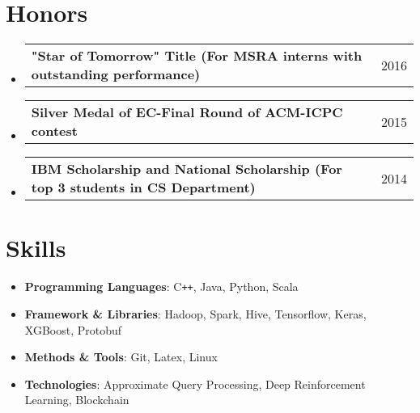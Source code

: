 \documentclass[a4paper,11pt]{article}
\makeatletter
\newcommand{\resumeMiniheading}[2]{
  \vspace{-1pt}\item
    \begin{tabular*}{0.97\textwidth}{l@{\extracolsep{\fill}}r}
      \textbf{#1} & #2
    \end{tabular*}
}
\makeatother
\begin{document}
\section{Honors}
  \begin{itemize}[leftmargin=*, itemsep=-1pt, label={}]
    \resumeMiniheading{"Star of Tomorrow" Title {\normalfont(For MSRA interns with outstanding performance)}}{2016}
    \resumeMiniheading{Silver Medal of EC-Final Round of ACM-ICPC contest}{2015}
    \resumeMiniheading{IBM Scholarship and National Scholarship {\normalfont(For top 3 students in CS Department)}}{2014}
  \end{itemize}

\section{Skills}
  \begin{itemize}[leftmargin=*, itemsep=-2pt, label={}]
    \item{
      \textbf{Programming Languages}{: C\texttt{++}, Java, Python, Scala}
    }
    \item{
      \textbf{Framework \& Libraries}{: Hadoop, Spark, Hive, Tensorflow, Keras, XGBoost, Protobuf}
    }
    \item{
      \textbf{Methods \& Tools}{: Git, Latex, Linux}
    }
    \item{
      \textbf{Technologies}{: Approximate Query Processing, Deep Reinforcement Learning, Blockchain}
    }
  \end{itemize}


\end{document}
